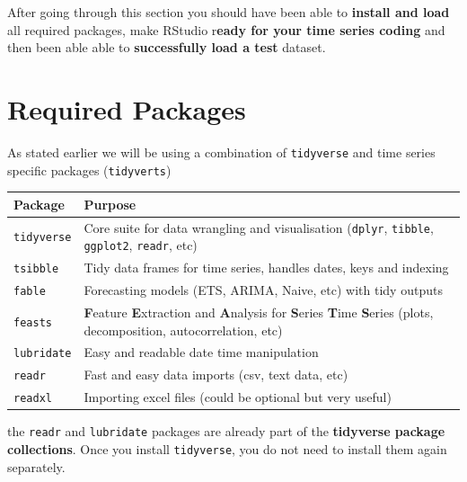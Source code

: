 \documentclass[
  letterpaper,
  DIV=11,
  numbers=noendperiod]{scrreprt}
\begin{document}
After going through this section you should have been able to
\textbf{install and load} all required packages, make RStudio
r\textbf{eady for your time series coding} and then been able able to
\textbf{successfully load a test} dataset.

\chapter{Required Packages}\label{sec-required-packages}

As stated earlier we will be using a combination of \texttt{tidyverse}
and time series specific packages (\texttt{tidyverts})

\begin{longtable}[]{@{}
  >{\raggedright\arraybackslash}p{}
  >{\raggedright\arraybackslash}p{}@{}}
\toprule\noalign{}
\begin{minipage}[b]{\linewidth}\raggedright
Package
\end{minipage} & \begin{minipage}[b]{\linewidth}\raggedright
Purpose
\end{minipage} \\
\midrule\noalign{}
\endhead
\bottomrule\noalign{}
\endlastfoot
\texttt{tidyverse} & Core suite for data wrangling and visualisation
(\texttt{dplyr}, \texttt{tibble}, \texttt{ggplot2}, \texttt{readr},
etc) \\
\texttt{tsibble} & Tidy data frames for time series, handles dates, keys
and indexing \\
\texttt{fable} & Forecasting models (ETS, ARIMA, Naive, etc) with tidy
outputs \\
\texttt{feasts} & \textbf{F}eature \textbf{E}xtraction and
\textbf{A}nalysis for \textbf{S}eries \textbf{T}ime \textbf{S}eries
(plots, decomposition, autocorrelation, etc) \\
\texttt{lubridate} & Easy and readable date time manipulation \\
\texttt{readr} & Fast and easy data imports (csv, text data, etc) \\
\texttt{readxl} & Importing excel files (could be optional but very
useful) \\
\end{longtable}

\begin{tcolorbox}[enhanced jigsaw, rightrule=.15mm, opacitybacktitle=0.6, breakable, colframe=quarto-callout-note-color-frame, opacityback=0, colbacktitle=quarto-callout-note-color!10!white, leftrule=.75mm, titlerule=0mm, toprule=.15mm, coltitle=black, colback=white, bottomrule=.15mm, left=2mm, bottomtitle=1mm, arc=.35mm, toptitle=1mm, title=\textcolor{quarto-callout-note-color}{\faInfo}\hspace{0.5em}{Note}]

the \texttt{readr} and \texttt{lubridate} packages are already part of
the \textbf{tidyverse package collections}. Once you install
\texttt{tidyverse}, you do not need to install them again separately.

\end{tcolorbox}
\end{document}
